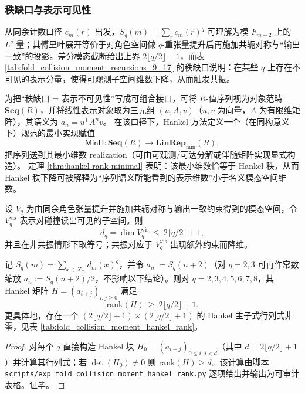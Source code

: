 \subsubsection{秩缺口与表示可见性}\label{subsec:pom-moment-visibility}
从同余计数口径 \(c_m(r)\) 出发，\(S_q(m)=\sum_r c_m(r)^q\) 可理解为模 \(F_{m+2}\) 上的 \(L^q\) 量；其傅里叶展开等价于对角色空间做 \(q\)-重张量提升后再施加共轭对称与“输出一致”的投影。差分模态截断给出上界 \(2\lfloor q/2\rfloor+1\)，而表 \ref{tab:fold_collision_moment_recursions_9_17} 的秩缺口说明：在某些 \(q\) 上存在不可见的表示分量，使得可观测子空间维数下降，从而触发共振。

\begin{remark}\label{rem:pom-minh-functor}
为把“秩缺口 = 表示不可见性”写成可组合接口，可将 \(R\)-值序列视为对象范畴 \(\mathbf{Seq}(R)\)，并将线性表示对象取为三元组 \((u,A,v)\)（\(u,v\) 为向量，\(A\) 为有限维矩阵），其语义为
\(
a_n=u^{\mathsf T}A^n v
\)。
在该口径下，Hankel 方法定义一个（在同构意义下）规范的最小实现赋值
\[
\mathsf{MinH}:\mathbf{Seq}(R)\to \mathbf{LinRep}_{\min}(R),
\]
把序列送到其最小维数 realization（可由可观测/可达分解或伴随矩阵实现显式构造）。
定理 \ref{thm:hankel-rank-minimal} 表明：该最小维数恰等于 Hankel 秩，从而 Hankel 秩下降可被解释为“序列语义所能看到的表示维数”小于名义模态空间维数。
\end{remark}

\begin{conjecture}[模态可见性与闭合维数]\label{conj:pom-moment-visible}
设 \(V_q\) 为由同余角色张量提升并施加共轭对称与输出一致约束得到的模态空间，令 \(V_q^{\mathrm{vis}}\) 表示对碰撞读出可见的子空间。则
\[
d_q=\dim V_q^{\mathrm{vis}}\ \le\ 2\lfloor q/2\rfloor+1,
\]
并且在非共振情形下取等号；共振对应于 \(V_q^{\mathrm{vis}}\) 出现额外约束而降维。
\end{conjecture}

\begin{theorem}\label{thm:pom-moment-hankel}
记 \(S_q(m)=\sum_{x\in X_m} d_m(x)^q\)，并令 \(a_n:=S_q(n+2)\)（对 \(q=2,3\) 可再作常数缩放 \(a_n:=S_q(n+2)/2\)，不影响以下结论）。则对 \(q=2,3,4,5,6,7,8\)，其 Hankel 矩阵 \(H=(a_{i+j})_{i,j\ge 0}\) 满足
\[
\mathrm{rank}(H)\ \ge\ 2\lfloor q/2\rfloor+1.
\]
更具体地，存在一个 \((2\lfloor q/2\rfloor+1)\times(2\lfloor q/2\rfloor+1)\) 的 Hankel 主子式行列式非零，见表 \ref{tab:fold_collision_moment_hankel_rank}。
\end{theorem}
\begin{proof}
对每个 \(q\) 直接构造 Hankel 块 \(H_0=(a_{i+j})_{0\le i,j<d}\)（其中 \(d=2\lfloor q/2\rfloor+1\)）并计算其行列式；若 \(\det(H_0)\neq 0\) 则 \(\mathrm{rank}(H)\ge d\)。该计算由脚本 \texttt{scripts/exp\_fold\_collision\_moment\_hankel\_rank.py} 逐项给出并输出为可审计表格。证毕。
\end{proof}

